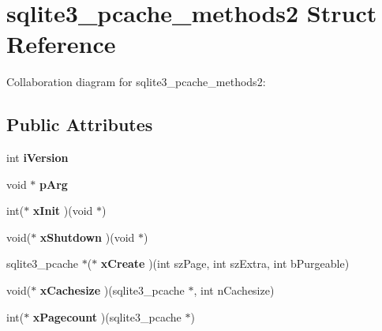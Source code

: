 \hypertarget{structsqlite3__pcache__methods2}{}\section{sqlite3\+\_\+pcache\+\_\+methods2 Struct Reference}
\label{structsqlite3__pcache__methods2}


Collaboration diagram for sqlite3\+\_\+pcache\+\_\+methods2\+:
\subsection*{Public Attributes}
\begin{DoxyCompactItemize}
\item 
int {\bfseries i\+Version}\hypertarget{structsqlite3__pcache__methods2_a03b27be6c7cb8f1d2662c454cbe58483}{}\label{structsqlite3__pcache__methods2_a03b27be6c7cb8f1d2662c454cbe58483}

\item 
void $\ast$ {\bfseries p\+Arg}\hypertarget{structsqlite3__pcache__methods2_a4bea91c33987eef02122bbf8a49745de}{}\label{structsqlite3__pcache__methods2_a4bea91c33987eef02122bbf8a49745de}

\item 
int($\ast$ {\bfseries x\+Init} )(void $\ast$)\hypertarget{structsqlite3__pcache__methods2_a8f77114458576c9d75cd53822fcd3462}{}\label{structsqlite3__pcache__methods2_a8f77114458576c9d75cd53822fcd3462}

\item 
void($\ast$ {\bfseries x\+Shutdown} )(void $\ast$)\hypertarget{structsqlite3__pcache__methods2_a00a780e295b89976940cd3cba2cfeaee}{}\label{structsqlite3__pcache__methods2_a00a780e295b89976940cd3cba2cfeaee}

\item 
sqlite3\+\_\+pcache $\ast$($\ast$ {\bfseries x\+Create} )(int sz\+Page, int sz\+Extra, int b\+Purgeable)\hypertarget{structsqlite3__pcache__methods2_a91e7752b826e19e7c51c1fa0ce530f0f}{}\label{structsqlite3__pcache__methods2_a91e7752b826e19e7c51c1fa0ce530f0f}

\item 
void($\ast$ {\bfseries x\+Cachesize} )(sqlite3\+\_\+pcache $\ast$, int n\+Cachesize)\hypertarget{structsqlite3__pcache__methods2_a4889ab0903938f485aa0fa4fc6925d26}{}\label{structsqlite3__pcache__methods2_a4889ab0903938f485aa0fa4fc6925d26}

\item 
int($\ast$ {\bfseries x\+Pagecount} )(sqlite3\+\_\+pcache $\ast$)\hypertarget{structsqlite3__pcache__methods2_a5d51aba3927db1da9acf31fbdf7d57b5}{}\label{structsqlite3__pcache__methods2_a5d51aba3927db1da9acf31fbdf7d57b5}


\end{DoxyCompactItemize}
